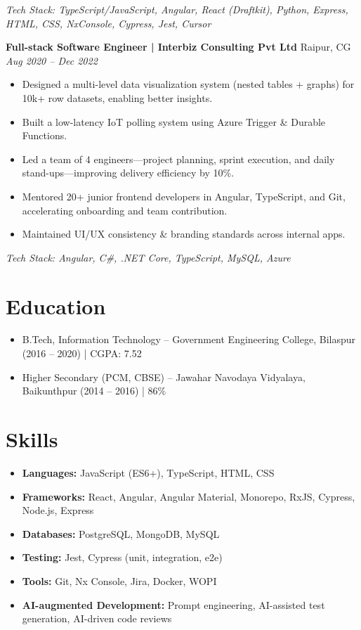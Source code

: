 \documentclass[a4paper,10pt]{article}
\begin{document}
\textit{Tech Stack: TypeScript/JavaScript, Angular, React (Draftkit), Python, Express, HTML, CSS, NxConsole, Cypress, Jest, Cursor}

\vspace{1em}

\textbf{Full-stack Software Engineer | Interbiz Consulting Pvt Ltd} \hfill Raipur, CG \quad \textit{Aug 2020 – Dec 2022}

\begin{itemize}
  \item Designed a multi-level data visualization system (nested tables + graphs) for 10k+ row datasets, enabling better insights.
  \item Built a low-latency IoT polling system using Azure Trigger \& Durable Functions.
  \item Led a team of 4 engineers—project planning, sprint execution, and daily stand-ups—improving delivery efficiency by 10\%.
  \item Mentored 20+ junior frontend developers in Angular, TypeScript, and Git, accelerating onboarding and team contribution.
  \item Maintained UI/UX consistency \& branding standards across internal apps.
\end{itemize}

\textit{Tech Stack: Angular, C\#, .NET Core, TypeScript, MySQL, Azure}

\section{Education}
\begin{itemize}
  \item B.Tech, Information Technology – Government Engineering College, Bilaspur (2016 – 2020) | CGPA: 7.52
  \item Higher Secondary (PCM, CBSE) – Jawahar Navodaya Vidyalaya, Baikunthpur (2014 – 2016) | 86\%
\end{itemize}

\section{Skills}
\begin{itemize}
  \item \textbf{Languages:} JavaScript (ES6+), TypeScript, HTML, CSS
  \item \textbf{Frameworks:} React, Angular, Angular Material, Monorepo, RxJS, Cypress, Node.js, Express
  \item \textbf{Databases:} PostgreSQL, MongoDB, MySQL
  \item \textbf{Testing:} Jest, Cypress (unit, integration, e2e)
  \item \textbf{Tools:} Git, Nx Console, Jira, Docker, WOPI
  \item \textbf{AI-augmented Development:} Prompt engineering, AI-assisted test generation, AI-driven code reviews
\end{itemize}
\end{document}
